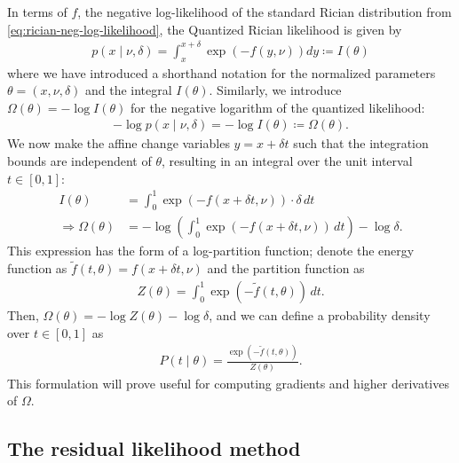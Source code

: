 \documentclass{article}
\begin{document}
In terms of $f$, the negative log-likelihood of the standard Rician distribution from \cref{eq:rician-neg-log-likelihood}, the Quantized Rician likelihood is given by
%
\begin{align}
  p(x \mid \nu, \delta) = \int_x^{x+\delta} \exp(-f(y, \nu)) dy \coloneqq I(\theta)
\end{align}
%
where we have introduced a shorthand notation for the normalized parameters $\theta = (x, \nu, \delta)$ and the integral $I(\theta)$.
Similarly, we introduce $\Omega(\theta) = -\log I(\theta)$ for the negative logarithm of the quantized likelihood:
%
\begin{align}
  -\log p(x \mid \nu, \delta) = -\log I(\theta) \coloneqq \Omega(\theta).
\end{align}
%
We now make the affine change variables $y = x + \delta t$ such that the integration bounds are independent of $\theta$, resulting in an integral over the unit interval $t \in [0, 1]$:
%
\begin{align}
  I(\theta)                  & = \int_0^1 \exp(-f(x + \delta t, \nu)) \cdot \delta \, dt                    \\
  \Rightarrow \Omega(\theta) & = -\log\left(\int_0^1 \exp(-f(x + \delta t, \nu)) \, dt\right) - \log\delta.
\end{align}
%
This expression has the form of a log-partition function;
denote the energy function as $\tilde{f}(t, \theta) = f(x + \delta t, \nu)$ and the partition function as
%
\begin{align}
  Z(\theta) = \int_0^1 \exp(-\tilde{f}(t, \theta)) \, dt.
\end{align}
%
Then, $\Omega(\theta) = -\log Z(\theta) - \log\delta$, and we can define a probability density over $t \in [0,1]$ as
%
\begin{align}
  P(t \mid \theta) = \frac{\exp(-\tilde{f}(t, \theta))}{Z(\theta)}.
\end{align}
%
This formulation will prove useful for computing gradients and higher derivatives of $\Omega$.

\subsection{The residual likelihood method}
\end{document}
